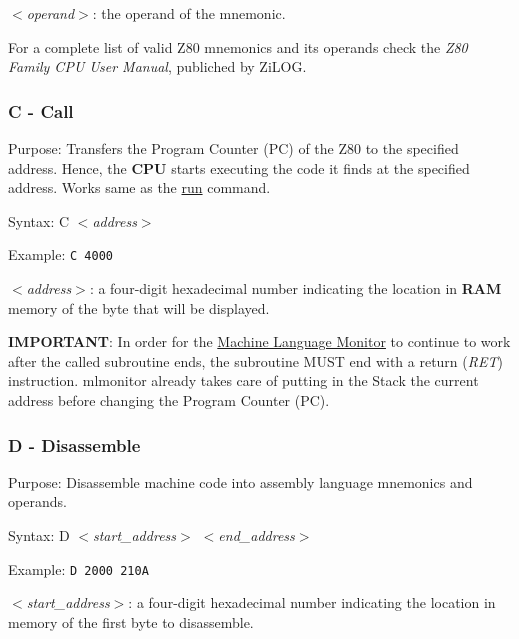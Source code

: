         \hspace{1cm}\textit{$<$operand$>$}: the operand of the mnemonic.

        For a complete list of valid Z80 mnemonics and its operands check the
        \textit{Z80 Family CPU User Manual}\cite{z80manual}, publiched by ZiLOG.

        \subsubsection{C - Call}

        Purpose: Transfers the Program Counter (PC) of the Z80 to the specified
        address. Hence, the \textbf{CPU} starts executing the code it finds at
        the specified address. Works same as the \hyperref[cmd:run]{run} command.

        Syntax: C \textit{$<$address$>$}

        Example: \texttt{C 4000}

        \hspace{1cm}\textit{$<$address$>$}: a four-digit hexadecimal number
        indicating the location in \textbf{RAM} memory of the byte that will be
        displayed.

        \textbf{IMPORTANT}: In order for the \hyperref[software:mlmonitor]
        {Machine Language Monitor} to continue to work after the called
        subroutine ends, the subroutine MUST end with a return (\textit{RET})
        instruction. mlmonitor already takes care of putting in the Stack the
        current address before changing the Program Counter (PC).

        \subsubsection{D - Disassemble}

        Purpose: Disassemble machine code into assembly language mnemonics and
        operands.

        Syntax: D \textit{$<$start\_address$>$ $<$end\_address$>$}

        Example: \texttt{D 2000 210A}

        \hspace{1cm}\textit{$<$start\_address$>$}: a four-digit hexadecimal
        number indicating the location in memory of the first byte to
        disassemble.

